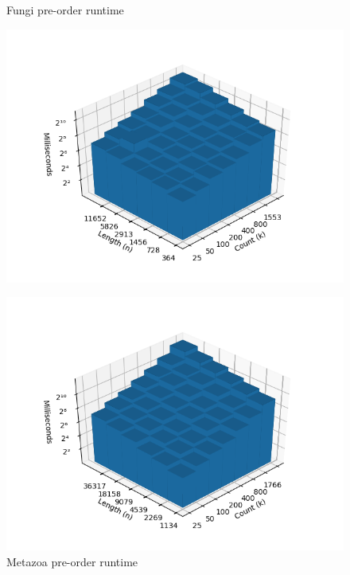 \documentclass{bmcart}
\begin{document}
\begin{backmatter}
	\begin{figure}[h]
		\centering
		\begin{minipage}{0.48\textwidth}
			\centering
			\caption{Fungi pre-order runtime}
			\label{Fig:Fungi}
			\includegraphics[width=1.1\textwidth]{fungi-preorder.png}
		\end{minipage}
		\hfill
		\begin{minipage}{0.48\textwidth}
			\centering
			\caption{Metazoa pre-order runtime}
			\label{Fig:Metazoa}
			\includegraphics[width=1.1\textwidth]{metazoa-preorder.png}
		\end{minipage}
		

\end{figure}
\end{backmatter}
\end{document}
